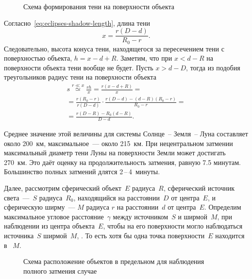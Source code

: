 \begin{figure}[h!]
    \centering
    
    \caption{Схема формирования тени на поверхности объекта}
    \label{pic:shadow-size-on-surface}    
\end{figure}

Согласно~\eqref{eq:eclipses-shadow-length}, длина тени
\begin{equation*}
    x = \frac{r (D - d)}{R_0 - r}.
\end{equation*}
Следовательно, высота конуса тени, находящегося за пересечением тени с поверхностью объекта, $h = x - d + R$. Заметим, что при $x < d - R$ на поверхности объекта тени вообще не будет. Пусть $x > d - D$, тогда из подобия треугольников радиус тени на поверхности объекта
\begin{multline}
    s 
        \overset{r \ll x}{\simeq} \frac{r h}{x} 
        = \frac{r(x - d + R)}{x} = \\
        = \frac{r (R_0 - r)}{r (D - d)} \cdot \frac{r(D - d) - (d - R)(R_0 - r)}{R_0 - r} = \\
        = \frac{r (D - R) - R_0 (d - R)}{D - d}.
\end{multline}

Среднее значение этой величины для системы Солнце~-- Земля~-- Луна составляет около 200~км, максимальное~--- около 215~км. При нецентральном затмении максимальный диаметр тени Луны на поверхности Земли может достигать 270~км. Это даёт оценку на продолжительность затмения, равную 7.5 минутам. Большинство полных затмений длятся 2\,--\,4~минуты.

Далее, рассмотрим сферический объект~$E$ радиуса~$R$, сферический источник света~---~$S$ радиуса~$R_0$, находящийся на расстоянии~$D$ от центра~$E$, и сферическую ширму~--- $M$ радиуса $r$ на расстоянии~$d$ от центра~$E$. Определим максимальное угловое расстояние~$\gamma$ между источником~$S$ и ширмой~$M$, при наблюдении из центра объекта~$E$, чтобы на его поверхности могло наблюдаться  источника~$S$ ширмой~$M$, . То есть хотя бы одна точка поверхности~$E$ находится в ~$M$.

\begin{figure}[h!]
    \centering
    
    \caption{Схема расположение объектов в предельном для наблюдения полного затмения случае}
    \label{pic:eclipse-vertical-distance}
\end{figure}

